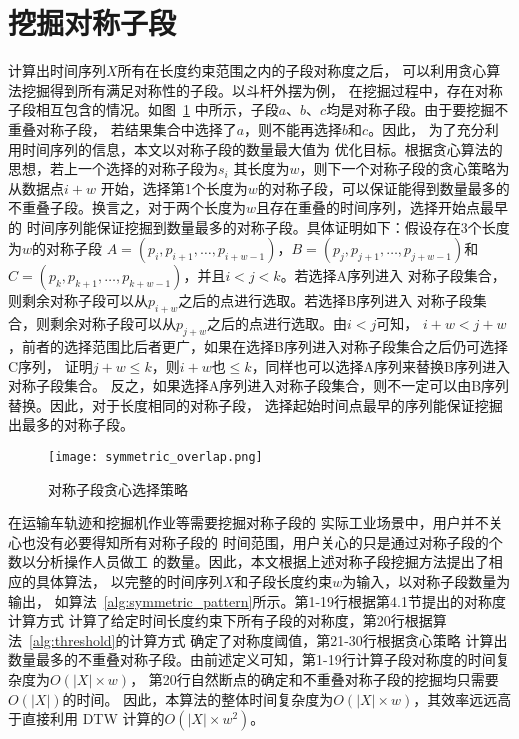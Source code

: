 \section{挖掘对称子段}

计算出时间序列$X$所有在长度约束范围之内的子段对称度之后，
可以利用贪心算法挖掘得到所有满足对称性的子段。以斗杆外摆为例，
在挖掘过程中，存在对称子段相互包含的情况。如图~\ref{fig:overlap}
中所示，子段$a$、$b$、$c$均是对称子段。由于要挖掘不重叠对称子段，
若结果集合中选择了$a$，则不能再选择$b$和$c$。因此，
为了充分利用时间序列的信息，本文以对称子段的数量最大值为
优化目标。根据贪心算法的思想，若上一个选择的对称子段为$s_i$
其长度为$w$，则下一个对称子段的贪心策略为从数据点$i+w$
开始，选择第1个长度为$w$的对称子段，可以保证能得到数量最多的
不重叠子段。换言之，对于两个长度为$w$且存在重叠的时间序列，选择开始点最早的
时间序列能保证挖掘到数量最多的对称子段。具体证明如下：假设存在3个长度为$w$的对称子段
$A=\left(p_{i}, p_{i+1}, \dots, p_{i+w-1}\right)$，$B=\left(p_{j}, p_{j+1}, \dots, p_{j+w-1}\right)$和
$C=\left(p_{k}, p_{k+1}, \dots, p_{k+w-1}\right)$，并且$i<j<k$。若选择A序列进入
对称子段集合，则剩余对称子段可以从$p_{i+w}$之后的点进行选取。若选择B序列进入
对称子段集合，则剩余对称子段可以从$p_{j+w}$之后的点进行选取。由$i<j$可知，
$i+w<j+w$，前者的选择范围比后者更广，如果在选择B序列进入对称子段集合之后仍可选择C序列，
证明$j+w \leq k$，则$i+w$也$\leq k$，同样也可以选择A序列来替换B序列进入对称子段集合。
反之，如果选择A序列进入对称子段集合，则不一定可以由B序列替换。因此，对于长度相同的对称子段，
选择起始时间点最早的序列能保证挖掘出最多的对称子段。

\begin{figure}
  \centering
  \texttt{[image: symmetric\_overlap.png]}
  \caption{对称子段贪心选择策略}
  \label{fig:overlap}
\end{figure}

在运输车轨迹和挖掘机作业等需要挖掘对称子段的
实际工业场景中，用户并不关心也没有必要得知所有对称子段的
时间范围，用户关心的只是通过对称子段的个数以分析操作人员做工
的数量。因此，本文根据上述对称子段挖掘方法提出了相应的具体算法，
以完整的时间序列$X$和子段长度约束$w$为输入，以对称子段数量为输出，
如算法~\ref{alg:symmetric_pattern}所示。第1-19行根据第4.1节提出的对称度计算方式
计算了给定时间长度约束下所有子段的对称度，第20行根据算法~\ref{alg:threshold}的计算方式
确定了对称度阈值，第21-30行根据贪心策略
计算出数量最多的不重叠对称子段。由前述定义可知，第1-19行计算子段对称度的时间复杂度为$O(|X| \times w)$，
第20行自然断点的确定和不重叠对称子段的挖掘均只需要$O(|X|)$的时间。
因此，本算法的整体时间复杂度为$O(|X| \times w)$，其效率远远高于直接利用
DTW 计算的$O\left(|X| \times w^{2}\right)$。
\renewcommand{\algorithmicrequire}{\textbf{输入：}\unskip}
\renewcommand{\algorithmicensure}{\textbf{输出：}\unskip}

